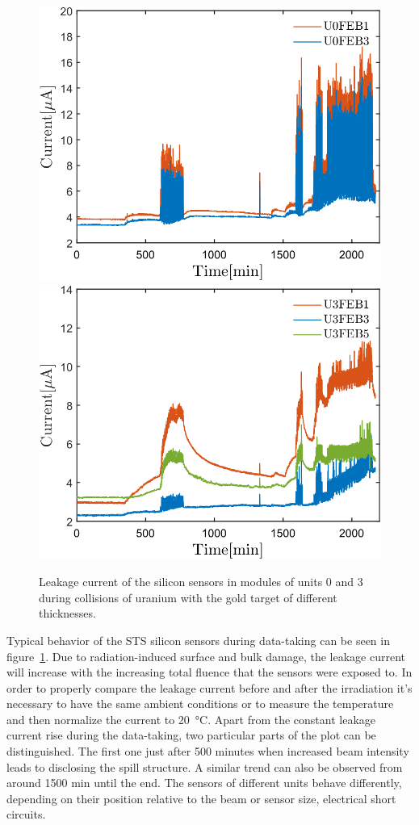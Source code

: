 \begin{figure}[!h]
\centering
\includegraphics[width=0.45\columnwidth]{Chapter6/DCS/images/uranium/U0.png}
\includegraphics[width=0.45\columnwidth]{Chapter6/DCS/images/uranium/U3.png}
\caption{Leakage current of the silicon sensors in modules of units 0 and 3 during collisions of uranium with the gold target of different thicknesses.}
\label{fig_msts_LC}
\end{figure}

Typical behavior of the \gls{STS} silicon sensors during data-taking can be seen in figure~\ref{fig_msts_LC}. Due to radiation-induced surface and bulk damage, the leakage current will increase with the increasing total fluence that the sensors were exposed to. In order to properly compare the leakage current before and after the irradiation it's necessary to have the same ambient conditions or to measure the temperature and then normalize the current to \SI{20}{\celsius}. Apart from the constant leakage current rise during the data-taking, two particular parts of the plot can be distinguished. The first one just after 500 minutes when increased beam intensity leads to disclosing the spill structure. A similar trend can also be observed from around 1500 min until the end. The sensors of different units behave differently, depending on their position relative to the beam or sensor size, electrical short circuits.


